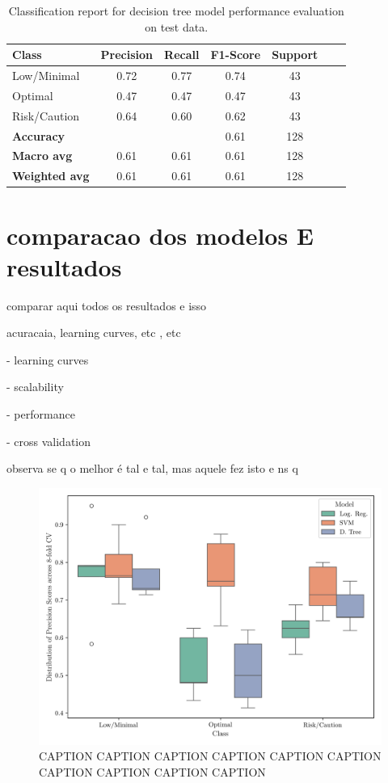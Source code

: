 \documentclass[conference]{IEEEtran}
\begin{document}
\begin{table}[H]
\centering
\caption{Classification report for decision tree model performance evaluation on test data.}
\begin{tabular}{lcccccc}
\toprule
\textbf{Class} & \textbf{Precision} & \textbf{Recall} & \textbf{F1-Score} & \textbf{Support} \\
\midrule
Low/Minimal & 0.72 & 0.77 & 0.74 & 43 \\
Optimal & 0.47 & 0.47 & 0.47 & 43 \\
Risk/Caution & 0.64 & 0.60 & 0.62 & 43 \\
\midrule
\textbf{Accuracy} &  &  & 0.61 & 128 \\
\textbf{Macro avg} & 0.61 & 0.61 & 0.61 & 128 \\
\textbf{Weighted avg} & 0.61 & 0.61 & 0.61 & 128 \\
\bottomrule
\end{tabular}
\end{table}

\section{comparacao dos modelos E resultados}

comparar aqui todos os resultados e isso

acuracaia, learning curves, etc , etc

- learning curves

- scalability 

- performance 

- cross validation

observa se q o melhor é tal e tal, mas aquele fez isto e ns q

\begin{figure}[H]
    \centering
    \includegraphics[width=1\linewidth]{assets/box_precision.png}
    \caption{CAPTION CAPTION CAPTION CAPTION CAPTION CAPTION CAPTION CAPTION CAPTION CAPTION}
    \label{box_precision}
\end{figure}
\end{document}

